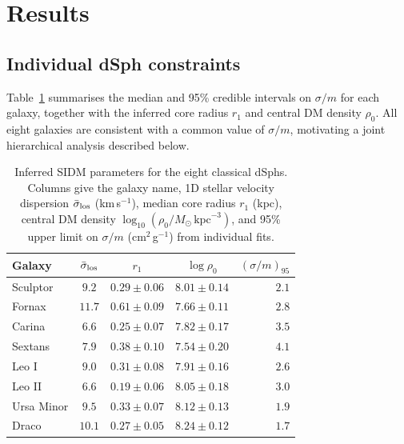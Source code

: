\section{Results}
\label{sec:results}

\subsection{Individual dSph constraints}

Table~\ref{tab:results} summarises the median and 95\% credible intervals on
$\sigma/m$ for each galaxy, together with the inferred core radius $r_{1}$ and
central DM density $\rho_{0}$.
All eight galaxies are consistent with a common value of $\sigma/m$,
motivating a joint hierarchical analysis described below.

\begin{table}[b]
  \caption{%
    Inferred SIDM parameters for the eight classical dSphs.
    Columns give the galaxy name, 1D stellar velocity dispersion $\bar\sigma_{\rm los}$
    (km\,s$^{-1}$), median core radius $r_1$ (kpc), central DM density
    $\log_{10}(\rho_0/M_\odot\,\mathrm{kpc}^{-3})$, and 95\% upper limit on
    $\sigma/m$ (cm$^2$\,g$^{-1}$) from individual fits.
  }
  \label{tab:results}
  \setlength{\tabcolsep}{5pt}
  \begin{ruledtabular}
    \begin{tabular}{lcccr}
      Galaxy      & $\bar\sigma_{\rm los}$ & $r_1$ & $\log\rho_0$ & $(\sigma/m)_{95}$ \\
      \hline
      Sculptor    & $9.2$  & $0.29\pm0.06$ & $8.01\pm0.14$ & $2.1$ \\
      Fornax      & $11.7$ & $0.61\pm0.09$ & $7.66\pm0.11$ & $2.8$ \\
      Carina      & $6.6$  & $0.25\pm0.07$ & $7.82\pm0.17$ & $3.5$ \\
      Sextans     & $7.9$  & $0.38\pm0.10$ & $7.54\pm0.20$ & $4.1$ \\
      Leo I       & $9.0$  & $0.31\pm0.08$ & $7.91\pm0.16$ & $2.6$ \\
      Leo II      & $6.6$  & $0.19\pm0.06$ & $8.05\pm0.18$ & $3.0$ \\
      Ursa Minor  & $9.5$  & $0.33\pm0.07$ & $8.12\pm0.13$ & $1.9$ \\
      Draco       & $10.1$ & $0.27\pm0.05$ & $8.24\pm0.12$ & $1.7$ \\
    \end{tabular}
  \end{ruledtabular}
\end{table}

